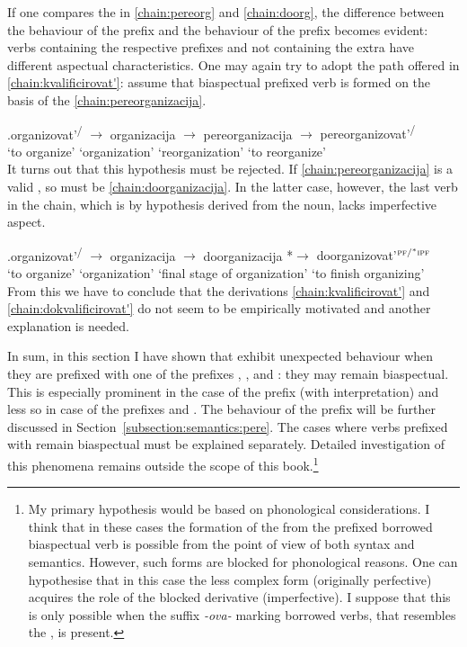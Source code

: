 If one compares the  in \ref{chain:pereorg} and \ref{chain:doorg}, the difference between the behaviour of the prefix  and the behaviour of the prefix  becomes evident: verbs containing the respective prefixes and not containing the extra  have different aspectual characteristics. One may again try to adopt the path offered in \ref{chain:kvalificirovat'}: assume that biaspectual prefixed verb is formed on the basis of the  \ref{chain:pereorganizacija}.
 
\exg.\label{chain:pereorganizacija}organizovat'\textsuperscript{\PF\slash\IPF} {$\rightarrow$} organizacija {$\rightarrow$} pereorganizacija {$\rightarrow$} {pereorganizovat'\textsuperscript{\PF\slash\IPF}}\\
{`to organize'} {} `organization' {} `reorganization' {} {`to reorganize'}\\

It turns out that this hypothesis must be rejected. If \ref{chain:pereorganizacija} is a valid , so must be \ref{chain:doorganizacija}. In the latter case, however, the last verb in the chain, which is by hypothesis derived from the noun, lacks imperfective aspect. 

\exg.\label{chain:doorganizacija}organizovat'\textsuperscript{\PF\slash\IPF} {$\rightarrow$} organizacija {$\rightarrow$} doorganizacija {*$\rightarrow$} {doorganizovat'$^{{\textsc{pf}}/^*{\textsc{ipf}}}$}\\
{`to organize'} {} `organization' {} {`final stage of organization'} {} {`to finish organizing'}\\

From this we have to conclude that the derivations \ref{chain:kvalificirovat'} and \ref{chain:dokvalificirovat'} do not seem to be empirically motivated and another explanation is needed. 

In sum, in this section I have shown that   exhibit unexpected behaviour when they are prefixed with one of the prefixes , , and : they may remain biaspectual. This is especially prominent in the case of the prefix  (with  interpretation) and less so in case of the prefixes  and . The  behaviour of the prefix  will be further discussed in Section~\ref{subsection:semantics:pere}. The cases where verbs prefixed with  remain biaspectual must be explained separately. Detailed investigation of this phenomena remains outside the scope of this book.\footnote{My primary hypothesis would be based on phonological considerations. I think that in these cases the formation of the  from the prefixed borrowed biaspectual verb is possible from the point of view of both syntax and semantics. However, such forms are blocked for phonological reasons. One can hypothesise that in this case the less complex form (originally perfective) acquires the role of the blocked derivative (imperfective). I suppose that this is only possible when the suffix \textit{-ova-} marking borrowed verbs, that resembles the , is present.}
	
